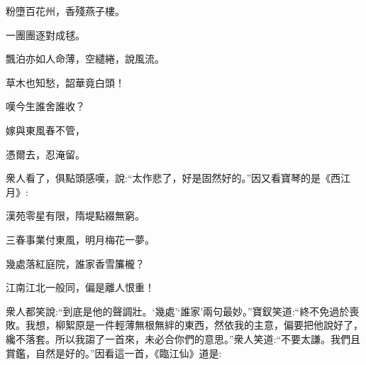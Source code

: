 \begin{poem}
    \begin{pl}粉墮百花州，香殘燕子樓。\end{pl}

    \begin{pl}一團團逐對成毬。\end{pl}

    \begin{pl}飄泊亦如人命薄，空繾綣，說風流。\end{pl}

    \begin{pl}草木也知愁，韶華竟白頭！\end{pl}

    \begin{pl}嘆今生誰舍誰收？\end{pl}

    \begin{pl}嫁與東風春不管，\end{pl}

    \begin{pl}憑爾去，忍淹留。\end{pl}

\end{poem}


\begin{parag}
    衆人看了，俱點頭感嘆，說:“太作悲了，好是固然好的。”因又看寶琴的是《西江月》:
\end{parag}


\begin{poem}
    \begin{pl}漢苑零星有限，隋堤點綴無窮。\end{pl}

    \begin{pl}三春事業付東風，明月梅花一夢。\end{pl}

    \begin{pl}幾處落紅庭院，誰家香雪簾櫳？\end{pl}

    \begin{pl}江南江北一般同，偏是離人恨重！\end{pl}

\end{poem}


\begin{parag}
    衆人都笑說:“到底是他的聲調壯。‘幾處’‘誰家’兩句最妙。”寶釵笑道:“終不免過於喪敗。我想，柳絮原是一件輕薄無根無絆的東西，然依我的主意，偏要把他說好了，纔不落套。所以我謅了一首來，未必合你們的意思。”衆人笑道:“不要太謙。我們且賞鑑，自然是好的。”因看這一首，《臨江仙》道是:
\end{parag}


